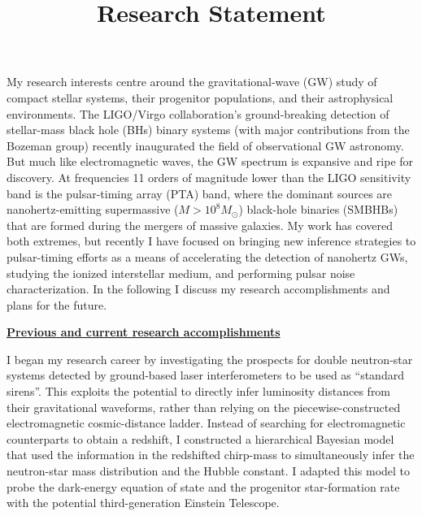 \documentclass[11pt,letterpaper,sans]{moderncv} %
\title{\huge{Research Statement}}
\begin{document}
\makecvtitle %
\setlength{\parskip}{1.3ex plus 0.5ex minus 0.3ex}
\vspace{-8mm}

\noindent My research interests centre around the gravitational-wave (GW) study of compact stellar systems, their progenitor populations, and their astrophysical environments. The LIGO/Virgo collaboration's ground-breaking detection of stellar-mass black hole (BHs) binary systems (with major contributions from the Bozeman group) recently inaugurated the field of observational GW astronomy. But much like electromagnetic waves, the GW spectrum is expansive and ripe for discovery. At frequencies 11 orders of magnitude lower than the LIGO sensitivity band is the pulsar-timing array (PTA) band, where the dominant sources are nanohertz-emitting supermassive ($M > 10^8M_\odot$) black-hole binaries (SMBHBs) that are formed during the mergers of massive galaxies. My work has covered both extremes, but recently I have focused on bringing new inference strategies to pulsar-timing efforts as a means of accelerating the detection of nanohertz GWs, studying the ionized interstellar medium, and performing pulsar noise characterization. In the following I discuss my research accomplishments and plans for the future.

\noindent \textbf{\underline{Previous and current research accomplishments}}

\noindent I began my research career by investigating the prospects for double neutron-star systems detected by ground-based laser interferometers to be used as ``standard sirens''. This exploits the potential to directly infer luminosity distances from their gravitational waveforms, rather than relying on the piecewise-constructed electromagnetic cosmic-distance ladder. Instead of searching for electromagnetic counterparts to obtain a redshift, I constructed a hierarchical Bayesian model that used the information in the redshifted chirp-mass to simultaneously infer the neutron-star mass distribution and the Hubble constant. %
I adapted this model to probe the dark-energy equation of state and the progenitor star-formation rate with the potential third-generation Einstein Telescope.
\end{document}
